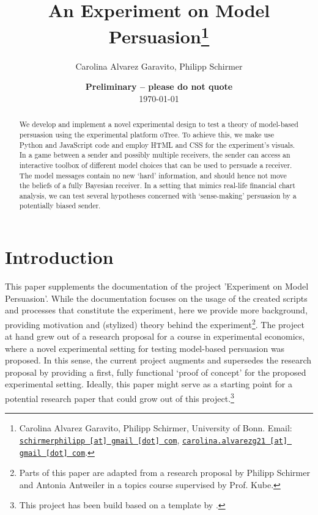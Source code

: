 \documentclass[11pt, a4paper, leqno]{article}
\begin{document}
\title{An Experiment on Model Persuasion\thanks{Carolina Alvarez Garavito, Philipp Schirmer, University of Bonn. Email: \href{mailto:schirmerphilipp@gmail.com}{\nolinkurl{schirmerphilipp [at] gmail [dot] com}}, \href{mailto:carolina.alvarezg21@gmail.com}{\nolinkurl{carolina.alvarezg21 [at] gmail [dot] com}}.}}

\author{Carolina Alvarez Garavito, Philipp Schirmer}

\date{
    {\bf Preliminary -- please do not quote}
    \\[1ex]
    \today
}

\maketitle


\begin{abstract}
    We develop and implement a novel experimental design to test a theory of model-based persuasion using the 
    experimental platform oTree. To achieve this, we make use Python and JavaScript code and employ HTML and CSS for the experiment's visuals. In a game between a sender and possibly multiple receivers, the sender can access an interactive toolbox of different model choices that can be used to persuade a receiver. The model messages contain no
    new `hard' information, and should hence not move the beliefs of a fully Bayesian receiver. In a setting that mimics real-life financial chart analysis, we can test several hypotheses concerned with `sense-making' persuasion by a potentially biased sender.
\end{abstract}
\clearpage

\section{Introduction} %
\label{sec:introduction}

This paper supplements the documentation of the project 'Experiment on Model Persuasion'. While the documentation focuses on the usage of the created scripts and processes that constitute the experiment, here we provide more background, providing motivation and (stylized) theory behind the experiment\footnote{Parts of this paper are adapted from a research proposal by Philipp Schirmer and Antonia Antweiler in a topics course supervised by Prof. Kube.}. The project at hand grew out of a research proposal for a course in experimental economics, where a novel experimental setting for testing model-based persuasion was proposed. In this sense, the current project augments and supersedes the research proposal by providing a first, fully functional `proof of concept' for the proposed experimental setting. Ideally, this paper might serve as a starting point for a potential research paper that could grow out of this project.\footnote{This project has been build based on a template by \cite{GaudeckerEconProjectTemplates}.}
\end{document}

